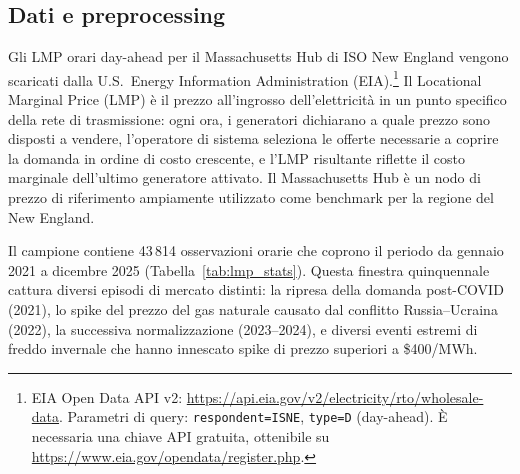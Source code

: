 \documentclass[12pt]{article}
\begin{document}
\subsection{Dati e preprocessing}
\label{sec:preprocessing}

Gli LMP orari day-ahead per il Massachusetts Hub di ISO New England vengono scaricati dalla U.S.\ Energy Information Administration (EIA).\footnote{EIA Open Data API v2: \url{https://api.eia.gov/v2/electricity/rto/wholesale-data}. Parametri di query: \texttt{respondent=ISNE}, \texttt{type=D} (day-ahead). È necessaria una chiave API gratuita, ottenibile su \url{https://www.eia.gov/opendata/register.php}.}
Il Locational Marginal Price (LMP) è il prezzo all'ingrosso dell'elettricità in un punto specifico della rete di trasmissione: ogni ora, i generatori dichiarano a quale prezzo sono disposti a vendere, l'operatore di sistema seleziona le offerte necessarie a coprire la domanda in ordine di costo crescente, e l'LMP risultante riflette il costo marginale dell'ultimo generatore attivato.
Il Massachusetts Hub è un nodo di prezzo di riferimento ampiamente utilizzato come benchmark per la regione del New England.

Il campione contiene 43\,814 osservazioni orarie che coprono il periodo da gennaio 2021 a dicembre 2025 (Tabella~\ref{tab:lmp_stats}).
Questa finestra quinquennale cattura diversi episodi di mercato distinti: la ripresa della domanda post-COVID (2021), lo spike del prezzo del gas naturale causato dal conflitto Russia--Ucraina (2022), la successiva normalizzazione (2023--2024), e diversi eventi estremi di freddo invernale che hanno innescato spike di prezzo superiori a \$400/MWh.
\end{document}
